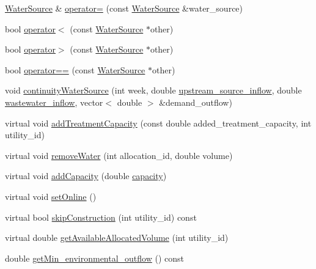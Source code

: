 \begin{DoxyCompactItemize}
\item 
\mbox{\hyperlink{classWaterSource}{Water\+Source}} \& \mbox{\hyperlink{classWaterSource_aafdaafb023a35186ae01d213665b5e27}{operator=}} (const \mbox{\hyperlink{classWaterSource}{Water\+Source}} \&water\+\_\+source)
\item 
bool \mbox{\hyperlink{classWaterSource_accb044cc78f9a444ca18bf7283b5b596}{operator$<$}} (const \mbox{\hyperlink{classWaterSource}{Water\+Source}} $\ast$other)
\item 
bool \mbox{\hyperlink{classWaterSource_a9db800769891e1f49d74a78298f4dac1}{operator$>$}} (const \mbox{\hyperlink{classWaterSource}{Water\+Source}} $\ast$other)
\item 
bool \mbox{\hyperlink{classWaterSource_af25e06ec954898f3392cb125d2f2c2ad}{operator==}} (const \mbox{\hyperlink{classWaterSource}{Water\+Source}} $\ast$other)
\item 
void \mbox{\hyperlink{classWaterSource_a1137cd86f8d3f8a48ebec54282132993}{continuity\+Water\+Source}} (int week, double \mbox{\hyperlink{classWaterSource_a7a69b2e9b6030f1035e6cf44d2918ee5}{upstream\+\_\+source\+\_\+inflow}}, double \mbox{\hyperlink{classWaterSource_aeb5a2d2d83383a70ca20f3e94635a9c7}{wastewater\+\_\+inflow}}, vector$<$ double $>$ \&demand\+\_\+outflow)
\item 
virtual void \mbox{\hyperlink{classWaterSource_a210818957f088da4046597d0f1a1340f}{add\+Treatment\+Capacity}} (const double added\+\_\+treatment\+\_\+capacity, int utility\+\_\+id)
\item 
virtual void \mbox{\hyperlink{classWaterSource_ab697c3a0765d445f72533f6a5f139bd9}{remove\+Water}} (int allocation\+\_\+id, double volume)
\item 
virtual void \mbox{\hyperlink{classWaterSource_abffedb6e58620b1b1d6f3c4b4480d3a0}{add\+Capacity}} (double \mbox{\hyperlink{classWaterSource_a2ec257b415b248214a8bce7fc5267723}{capacity}})
\item 
virtual void \mbox{\hyperlink{classWaterSource_ab3396e2915db91a6c82e0f29c7889df4}{set\+Online}} ()
\item 
virtual bool \mbox{\hyperlink{classWaterSource_ac3105a8ef5470af2e40e7ed74a9be157}{skip\+Construction}} (int utility\+\_\+id) const
\item 
virtual double \mbox{\hyperlink{classWaterSource_a42c687a3be3d88ba38dbea668c8d35cf}{get\+Available\+Allocated\+Volume}} (int utility\+\_\+id)
\item 
double \mbox{\hyperlink{classWaterSource_af7607924825ffe293179b09fe1bc466e}{get\+Min\+\_\+environmental\+\_\+outflow}} () const

\end{DoxyCompactItemize}
